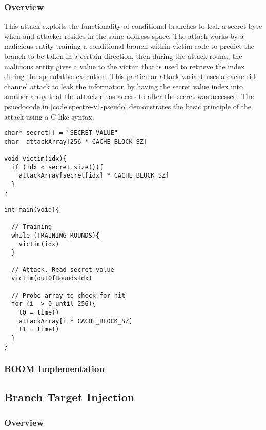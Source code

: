 \subsubsection{Overview}

This attack exploits the functionality of conditional branches to leak a secret byte 
when and attacker resides in the same address space. The attack works by a 
malicious entity training a conditional branch within victim code to predict the branch
to be taken in a certain direction, then during the attack round, the malicious entity
gives a value to the victim that is used to retrieve the index during the speculative
execution. This particular attack variant uses a cache side channel attack to leak the
information by having the secret value index into another array that the attacker has
access to after the secret was accessed. The psuedocode in \ref{code:spectre-v1-pseudo}
demonstrates the basic principle of the attack using a C-like syntax.

\begin{lstlisting}[caption=Psuedocode of Bounds Check Bypass Attack]
char* secret[] = "SECRET_VALUE"
char  attackArray[256 * CACHE_BLOCK_SZ]

void victim(idx){
  if (idx < secret.size()){
    attackArray[secret[idx] * CACHE_BLOCK_SZ]
  }
}

int main(void){
  
  // Training
  while (TRAINING_ROUNDS){
    victim(idx)
  }

  // Attack. Read secret value
  victim(outOfBoundsIdx)

  // Probe array to check for hit
  for (i -> 0 until 256){
    t0 = time()
    attackArray[i * CACHE_BLOCK_SZ]
    t1 = time()
  }
}
\end{lstlisting}\label{code:spectre-v1-pseudo}

\subsubsection{BOOM Implementation}

\subsection{Branch Target Injection}

\subsubsection{Overview}

